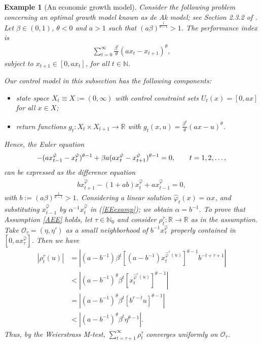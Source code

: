\documentclass[3p]{elsarticle}
\newcommand{\rz}{\mathbb R}
\newcommand{\nat}{\mathbb N_0}
\newcommand{\natu}{\mathbb N}
\newtheorem{examp}[thm]{Example}
\begin{document}
	\begin{examp}[An economic growth model]
		Consider the following problem concerning an optimal growth model known as de \textit{Ak model}; see Section 2.3.2  of \cite{DavidEE}. Let $\beta\in(0,1)$, $\theta<0$ and $a>1$ such that $(a\beta)^{\frac{1}{\theta-1}}>1$. The performance index is 
		\begin{align*}
		\sum_{t=0}^\infty \frac{\beta^t}{\theta}(ax_{t}-x_{t+1})^{\theta},
		\end{align*}
		subject to $x_{t+1}\in[0,ax_{t}]$, for all $t\in\natu$.
		
		Our control model in this subsection has the following components:
		
		\begin{itemize}
			\item state space $X_t\equiv X:=(0,\infty)$ with control constraint sets $U_t(x)=[0,ax]$ for all $x\in X$;
			\item return functions $g_t:X_{t}\times X_{t+1}\to \rz$ with $g_t(x,u)=\frac{\beta^t}{\theta} (ax-u)^{\theta}$. 
		\end{itemize} Hence, the Euler equation
		\begin{align*}
		-(ax_{t-1}^{\hat\varphi}-x_t^{\hat\varphi})^{\theta-1}+\beta a(ax_{t}^{\hat\varphi}-x_{t+1}^{\hat\varphi})^{\theta-1}=0, \hspace{0.7cm} t=1,2,\dots,
		\end{align*}
		can be expressed as the difference equation
		\begin{align}\label{EEexamp}
		bx_{t+1}^{\hat\varphi}-(1+ab)x_t^{\hat \varphi}+ax_{t-1}^{\hat\varphi}=0,
		\end{align}
		with $b:=(a\beta)^{\frac{1}{\theta-1}}>1$. Considering a linear solution $\hat\varphi_t(x)=\alpha x$, and substituting  $x_{t-1}^{\hat\varphi}$ by $\alpha^{-1}x_t^{\hat\varphi}$ in (\ref{EEexamp}); we obtain $\alpha=b^{-1}$.
		To prove that Assumption \ref{AEE} holds, let $\tau\in\nat$ and consider $\rho_t^\tau:\rz\to\rz$ as in the assumption. Take $\mathcal O_\tau=(\eta,\eta')$ as a small neighborhood of $b^{-1}x_\tau^{\hat\varphi}$ properly contained in $[0,ax_\tau^{\hat\varphi}]$. Then we have
		\begin{align*}
		\left|\rho_{t}^{\tau}(u)\right|&=\left|(a-b^{-1})\beta^t[(a-b^{-1})x_t^{\hat\varphi^\tau(u)}]^{\theta-1}b^{-t+\tau+1}\right|\\
		&<\left|(a-b^{-1})^{\theta}\beta^t [x_t^{\hat\varphi^\tau(u)}]^{\theta-1}\right|\\
		&=\left|(a-b^{-1})^{\theta}\beta^t [b^{\tau-t}u]^{\theta-1}\right|\\
		&<\left|(a-b^{-1})^{\theta}\beta^t\eta^{\theta-1}\right|.
		\end{align*}
		Thus, by the Weierstrass M-test, $\displaystyle\sum_{t=\tau+1}^{\infty}\rho^\tau_t$ converges uniformly on $\mathcal O_\tau$.
	\end{examp}
	
\end{document}
